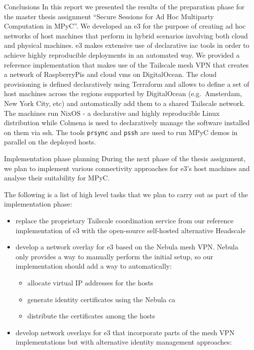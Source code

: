 \begin{frame}[fragile]{Conclusions}
\protect\hypertarget{conclusions}{}
In this report we presented the results of the preparation phase for the
master thesis assignment ``Secure Sessions for Ad Hoc Multiparty
Computation in MPyC''. We developed an \acrfull{e3} for the purpose of
creating ad hoc networks of host machines that perform 
in hybrid scenarios involving both cloud and physical machines. \gls{e3}
makes extensive use of declarative \gls{iac} tools in order to achieve
highly reproducible deployments in an automated way. We provided a
reference implementation that makes use of the Tailscale mesh VPN that
creates a network of RaspberryPis and cloud \glspl{vm} on DigitalOcean.
The cloud provisioning is defined declaratively using Terraform and
allows to define a set of host machines across the regions supported by
DigitalOcean (e.g.~Amsterdam, New York City, etc) and automatically add
them to a shared Tailscale network. The machines run NixOS - a
declarative and highly reproducible Linux distribution while Colmena is
used to declaratively manage the software installed on them via
\gls{ssh}. The tools \texttt{prsync} and \texttt{pssh} are used to run
MPyC demos in parallel on the deployed hosts.

\begin{block}{Implementation phase planning}
\protect\hypertarget{implementation-phase-planning}{}
During the next phase of the thesis assignment, we plan to implement
various connectivity approaches for \gls{e3}'s host machines and analyse
their suitability for MPyC.

The following is a list of high level tasks that we plan to carry out as
part of the implementation phase:

\begin{itemize}
\tightlist
\item
  replace the proprietary Tailscale coordination service from our
  reference implementation of \gls{e3} with the open-source self-hosted
  alternative Headscale\autocite{fontJuanfontHeadscale2022}
\item
  develop a network overlay for \gls{e3} based on the Nebula mesh VPN.
  Nebula only provides a way to manually perform the initial setup, so
  our implementation should add a way to automatically:

  \begin{itemize}
  \tightlist
  \item
    allocate virtual IP addresses for the hosts
  \item
    generate identity certificates using the Nebula \gls{ca}
  \item
    distribute the certificates among the hosts
  \end{itemize}
\item
  develop network overlays for \gls{e3} that incorporate parts of the
  mesh VPN implementations but with alternative identity management
  approaches:


\end{itemize}
\end{block}
\end{frame}
